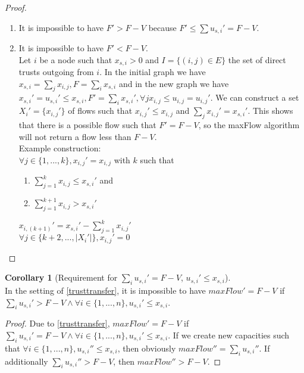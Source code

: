 \documentclass[11pt]{article}
\theoremstyle{definition}
\theoremstyle{corollary}
\newtheorem{corollary}{Corollary}[section]
\begin{document}
    \begin{proof} \
       \begin{enumerate}
         \item  It is impossible to have $F' > F - V$ because $F' \leq \sum{u_{s, i}'} = F - V$.
         \item  It is impossible to have $F' < F - V$. \\
         Let $i$ be a node such that $x_{s, i} > 0$ and $I = \{(i,j) \in E\}$ the set of direct trusts outgoing from $i$.
         In the initial graph we have $x_{s, i} = \sum_{j}{x_{i, j}}, F = \sum_{i}{x_{s, i}}$
         and in the new graph we have $x_{s, i}' = u_{s, i}' \leq x_{s, i},
         F' = \sum_{i}{x_{s, i}'}, \forall j x_{i, j} \leq u_{i, j} = u_{i, j}'$.
         We can construct a set $X_i' = \{x_{i, j}'\}$ of flows such that $x_{i, j}' \leq x_{i, j}$
         and $\sum_{j}{x_{i, j}'} = x_{s, i}'$. This shows that there is a possible flow such that $F' = F - V$,
         so the maxFlow algorithm will not return a flow less than $F - V$. \\
         Example construction: \\
         $\forall j \in \{1,...,k\}, x_{i, j}' = x_{i, j}$ with $k$ such that
            \begin{enumerate}
	      \item $\sum_{j=1}^{k}{x_{i, j}} \leq x_{s, i}'$ and
	      \item $\sum_{j=1}^{k+1}{x_{i, j}} > x_{s, i}'$
            \end{enumerate}
         $x_{i, (k+1)}' = x_{s, i}' - \sum_{j=1}^{k}{x_{i, j}'}$ \\
         $\forall j \in \{k+2,...,|X_i'|\}, x_{i, j}' = 0$
       \end{enumerate}
    \end{proof}

    \begin{corollary}[Requirement for $\sum_{i}{u_{s, i}'} = F - V$, $u_{s, i}' \leq x_{s, i}$] \ \\
       In the setting of \ref{trusttransfer}, it is impossible to have $maxFlow' = F - V$ if $\sum_{i}{u_{s, i}'} > F - V
       \wedge \forall i \in \{1,...,n\},u_{s, i}' \leq x_{s, i}$.
    \end{corollary}
    \begin{proof}
       Due to \ref{trusttransfer}, $maxFlow' = F - V$ if $\sum_{i}{u_{s, i}'} = F - V
       \wedge \forall i \in \{1,...,n\}, u_{s, i}' \leq x_{s, i}$. If we create new capacities such that
       $\forall i \in \{1,...,n\}, u_{s,i}'' \leq x_{s,i}$, then obviously $maxFlow'' = \sum_{i}{u_{s,i}''}$. If
       additionally $\sum_{i}{u_{s,i}''} > F - V$, then $maxFlow'' > F - V$.
    \end{proof}
\end{document}
